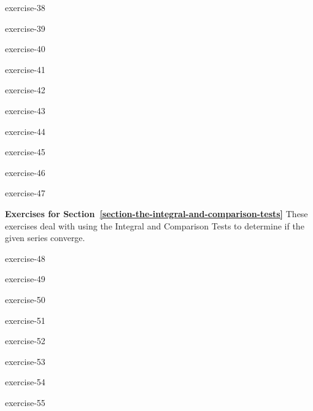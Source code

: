 \documentclass[10pt,]{book}
\numberwithin{equation}{section}
\begin{document}
\begin{exercisegroup}{1}
\begin{divisionexercise}{11}{}{}{exercise-38}%
\end{divisionexercise}%
\begin{divisionexercise}{12}{}{}{exercise-39}%
\end{divisionexercise}%
\begin{divisionexercise}{13}{}{}{exercise-40}%
\end{divisionexercise}%
\begin{divisionexercise}{14}{}{}{exercise-41}%
\end{divisionexercise}%
\begin{divisionexercise}{15}{}{}{exercise-42}%
\end{divisionexercise}%
\begin{divisionexercise}{16}{}{}{exercise-43}%
\end{divisionexercise}%
\begin{divisionexercise}{17}{}{}{exercise-44}%
\end{divisionexercise}%
\begin{divisionexercise}{18}{}{}{exercise-45}%
\end{divisionexercise}%
\begin{divisionexercise}{19}{}{}{exercise-46}%
\end{divisionexercise}%
\begin{divisionexercise}{20}{}{}{exercise-47}%
\end{divisionexercise}%
\end{exercisegroup}
\par\medskip\noindent
\par\medskip\noindent%
\textbf{Exercises for Section~\ref*{section-the-integral-and-comparison-tests}}\space\space\hypertarget{exercisegroup-10}{}%
\hypertarget{p-986}{}%
These exercises deal with using the Integral and Comparison Tests to determine if the given series converge.%
\begin{exercisegroup}{1}
\begin{divisionexercise}{21}{}{}{exercise-48}%
\end{divisionexercise}%
\begin{divisionexercise}{22}{}{}{exercise-49}%
\end{divisionexercise}%
\begin{divisionexercise}{23}{}{}{exercise-50}%
\end{divisionexercise}%
\begin{divisionexercise}{24}{}{}{exercise-51}%
\end{divisionexercise}%
\begin{divisionexercise}{25}{}{}{exercise-52}%
\end{divisionexercise}%
\begin{divisionexercise}{26}{}{}{exercise-53}%
\end{divisionexercise}%
\begin{divisionexercise}{27}{}{}{exercise-54}%
\end{divisionexercise}%
\begin{divisionexercise}{28}{}{}{exercise-55}%
\end{divisionexercise}%
\end{exercisegroup}
\end{document}
